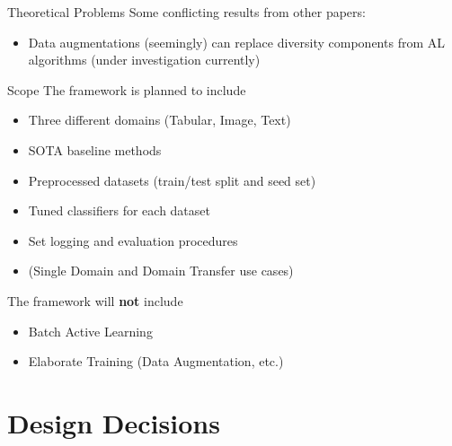 \documentclass[aspectratio=169, 11pt, invertlogo]{ismll-slides}
\begin{document}

\begin{frame}[fragile]{Theoretical Problems}
	Some conflicting results from other papers:
	\begin{itemize}
		\item Data augmentations (seemingly) can replace diversity components from AL algorithms (under investigation currently)
	\end{itemize}
\end{frame}


\begin{frame}[fragile]{Scope}
	The framework is planned to include
	\begin{itemize}
		\item Three different domains (Tabular, Image, Text)
		\item SOTA baseline methods 
		\item Preprocessed datasets (train/test split and seed set)
		\item Tuned classifiers for each dataset
		\item Set logging and evaluation procedures
		\item (Single Domain and Domain Transfer use cases)
	\end{itemize}
	The framework will \textbf{not} include
	\begin{itemize}
		\item Batch Active Learning
		\item Elaborate Training (Data Augmentation, etc.)
	\end{itemize}
\end{frame}


\section{Design Decisions}

\end{document}
